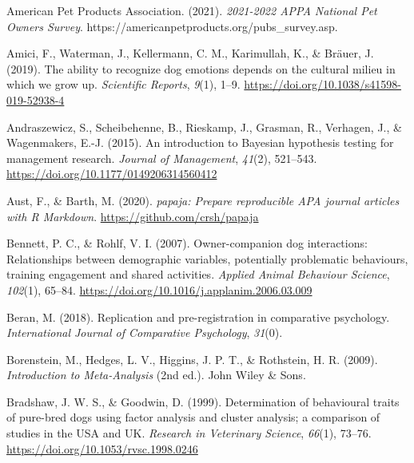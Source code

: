 \documentclass[
  pub,floatsintext]{apa6}
\newlength{\cslhangindent}
\newlength{\cslentryspacingunit} %
\newenvironment{CSLReferences}[2] %
 {%
  \setlength{\parindent}{0pt}
  \ifodd #1
  \let\oldpar\par
  \def\par{\hangindent=\cslhangindent\oldpar}
  \fi
  \setlength{\parskip}{#2\cslentryspacingunit}
 }%
 {}
\begin{document}
\hypertarget{refs}{}
\begin{CSLReferences}{1}{0}
\leavevmode{}%
American Pet Products Association. (2021). \emph{2021-2022 {APPA National Pet Owners Survey}}. https://americanpetproducts.org/pubs\_survey.asp.

\leavevmode{}%
Amici, F., Waterman, J., Kellermann, C. M., Karimullah, K., \& Bräuer, J. (2019). The ability to recognize dog emotions depends on the cultural milieu in which we grow up. \emph{Scientific Reports}, \emph{9}(1), 1--9. \url{https://doi.org/10.1038/s41598-019-52938-4}

\leavevmode{}%
Andraszewicz, S., Scheibehenne, B., Rieskamp, J., Grasman, R., Verhagen, J., \& Wagenmakers, E.-J. (2015). An introduction to {Bayesian} hypothesis testing for management research. \emph{Journal of Management}, \emph{41}(2), 521--543. \url{https://doi.org/10.1177/0149206314560412}

\leavevmode{}%
Aust, F., \& Barth, M. (2020). \emph{{papaja}: {Prepare} reproducible {APA} journal articles with {R Markdown}}. \url{https://github.com/crsh/papaja}

\leavevmode{}%
Bennett, P. C., \& Rohlf, V. I. (2007). Owner-companion dog interactions: {Relationships} between demographic variables, potentially problematic behaviours, training engagement and shared activities. \emph{Applied Animal Behaviour Science}, \emph{102}(1), 65--84. \url{https://doi.org/10.1016/j.applanim.2006.03.009}

\leavevmode{}%
Beran, M. (2018). Replication and pre-registration in comparative psychology. \emph{International Journal of Comparative Psychology}, \emph{31}(0).

\leavevmode{}%
Borenstein, M., Hedges, L. V., Higgins, J. P. T., \& Rothstein, H. R. (2009). \emph{Introduction to {Meta-Analysis}} (2nd ed.). {John Wiley \& Sons}.

\leavevmode{}%
Bradshaw, J. W. S., \& Goodwin, D. (1999). Determination of behavioural traits of pure-bred dogs using factor analysis and cluster analysis; a comparison of studies in the {USA} and {UK}. \emph{Research in Veterinary Science}, \emph{66}(1), 73--76. \url{https://doi.org/10.1053/rvsc.1998.0246}


\end{CSLReferences}
\end{document}
